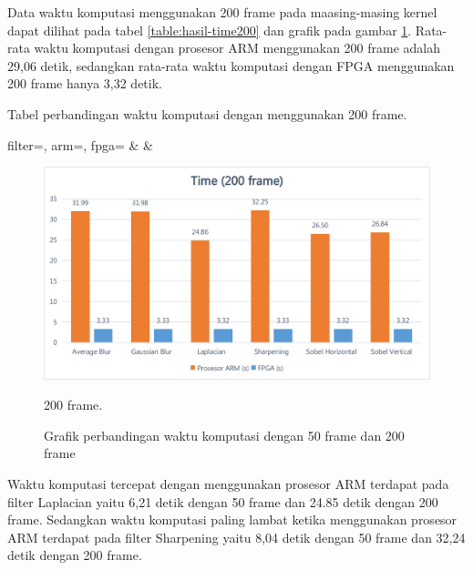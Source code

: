 Data waktu komputasi menggunakan 200 frame pada maasing-masing kernel dapat dilihat pada tabel \ref{table:hasil-time200} dan grafik pada gambar \ref{fig:chart-time200}. Rata-rata waktu komputasi dengan prosesor ARM menggunakan 200 frame adalah 29,06 detik, sedangkan rata-rata waktu komputasi dengan FPGA menggunakan 200 frame hanya 3,32 detik.
\begin{atable}
    \caption{Tabel perbandingan waktu komputasi dengan menggunakan 200 frame.}
    \label{table:hasil-time200}
        {
            filter=\filter, 
            arm=\arm, 
            fpga=\fpga}
        {
            \filter & 
            \arm & 
            \fpga }
\end{atable}

\begin{figure}[H]
    \centering
    \includegraphics[width=0.81\linewidth, center]{images/chart/chart-time200.png}
    \caption{200 frame.}
    \label{fig:chart-time200}
    \caption{Grafik perbandingan waktu komputasi dengan 50 frame dan 200 frame}
\end{figure}

Waktu komputasi tercepat dengan menggunakan prosesor ARM terdapat pada filter Laplacian yaitu 6,21 detik dengan 50 frame dan 24.85 detik dengan 200 frame. Sedangkan waktu komputasi paling lambat ketika menggunakan prosesor ARM terdapat pada filter Sharpening yaitu 8,04 detik dengan 50 frame dan 32,24 detik dengan 200 frame. 


